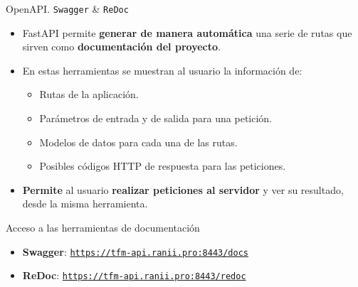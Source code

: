 \documentclass[aspectratio=169,xcolor=dvipsnames]{beamer}
\begin{document}
	\begin{frame}{OpenAPI. \texttt{Swagger} \& \texttt{ReDoc}}
		\begin{itemize}
			\item FastAPI permite \textbf{generar de manera automática} una serie de rutas que sirven como \textbf{documentación del proyecto}.
			
			\item En estas herramientas se muestran al usuario la información de: 
			
			\begin{itemize}
				\item Rutas de la aplicación.
				
				\item Parámetros de entrada y de salida para una petición.
				
				\item Modelos de datos para cada una de las rutas.
				
				\item Posibles códigos HTTP de respuesta para las peticiones.
			\end{itemize}
		
			\item \textbf{Permite} al usuario \textbf{realizar peticiones al servidor} y ver su resultado, desde la misma herramienta.
		\end{itemize}
		
		\begin{block}{Acceso a las herramientas de documentación}
			\begin{itemize}
				\item \textbf{Swagger}: \href{https://tfm-api.ranii.pro:8443/docs}{\texttt{https://tfm-api.ranii.pro:8443/docs}}
				
				\item \textbf{ReDoc}: \href{https://tfm-api.ranii.pro:8443/redoc}{\texttt{https://tfm-api.ranii.pro:8443/redoc}}
			\end{itemize}
		\end{block}
	\end{frame}
	
	
\end{document}
